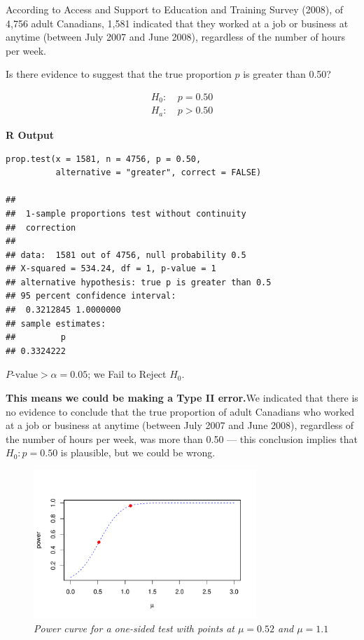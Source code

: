 \begin{example}
According to Access and Support to Education and Training Survey (2008), of 4,756 adult Canadians, 1,581 indicated that they worked at a job or business at anytime (between July 2007 and June 2008), regardless of the number of hours per week.

Is there evidence to suggest that the true proportion $p$ is greater than 0.50?

\begin{align*}
H_0\!:&\ p = 0.50 \\
H_a\!:&\ p > 0.50
\end{align*}


\noindent\textbf{R Output}
\begin{tcolorbox}[colback=gray!10, colframe=black!45, arc=2mm]
\begin{verbatim}
prop.test(x = 1581, n = 4756, p = 0.50,
          alternative = "greater", correct = FALSE)

## 
##  1-sample proportions test without continuity
##  correction
## 
## data:  1581 out of 4756, null probability 0.5
## X-squared = 534.24, df = 1, p-value = 1
## alternative hypothesis: true p is greater than 0.5
## 95 percent confidence interval:
##  0.3212845 1.0000000
## sample estimates:
##         p 
## 0.3324222 
\end{verbatim}
\end{tcolorbox}


\textbf{$P\text{-value} > \alpha = 0.05$}; we Fail to Reject $H_0$.

\textbf{This means we could be making a Type II error.}We indicated that there is no evidence to conclude that the true proportion of adult Canadians who worked at a job or business at anytime (between July 2007 and June 2008), regardless of the number of hours per week, was more than 0.50 — this conclusion implies that $H_0: p = 0.50$ is plausible, but we could be wrong.
\begin{figure}[H]  %
\centering
\includegraphics[width=0.75\textwidth]{section13/images/power_curve.pdf}
\caption{\textit{Power curve for a one-sided test with points at $\mu = 0.52$ and $\mu = 1.1$}}
\end{figure}

\end{example}
